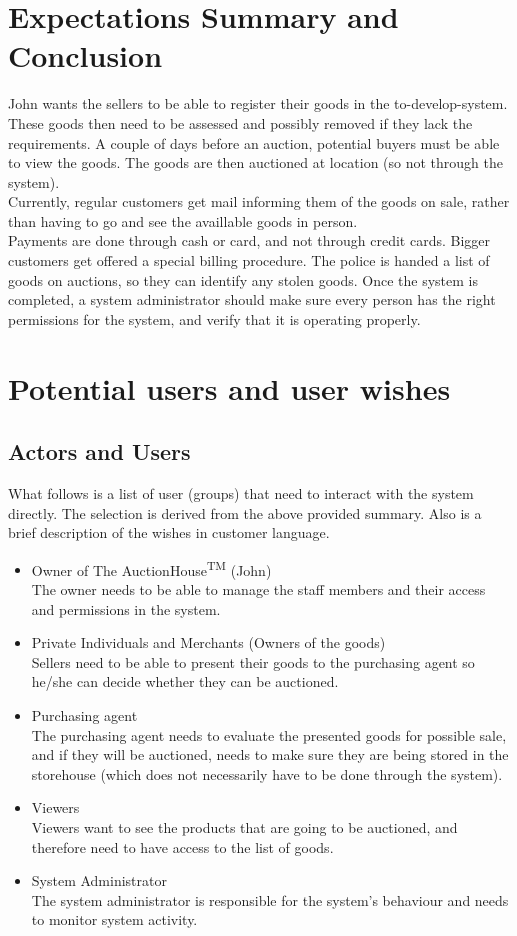 \documentclass{article}
\begin{document}
\section*{Expectations Summary and Conclusion}
John wants the sellers to be able to register their goods in the to-develop-system. These goods then need to be assessed and possibly removed if they lack the requirements. A couple of days before an auction, potential buyers must be able to view the goods. The goods are then auctioned at location (so not through the system).\\
Currently, regular customers get mail informing them of the goods on sale, rather than having to go and see the availlable goods in person.\\
Payments are done through cash or card, and not through credit cards. Bigger customers get offered a special billing procedure.
The police is handed a list of goods on auctions, so they can identify any stolen goods.
Once the system is completed, a system administrator should make sure every person has the right permissions for the system, and verify that it is operating properly.

\section*{Potential users and user wishes}
\subsection*{Actors and Users}
What follows is a list of user (groups) that need to interact with the system directly. The selection is derived from the above provided summary. Also is a brief description of the wishes in customer language.
\begin{itemize}
	\item Owner of The AuctionHouse\textsuperscript{TM} (John)\\
		The owner needs to be able to manage the staff members and their access and permissions in the system.
	\item Private Individuals and Merchants (Owners of the goods)\\
		Sellers need to be able to present their goods to the purchasing agent so he/she can decide whether they can be auctioned.
	\item Purchasing agent\\
		The purchasing agent needs to evaluate the presented goods for possible sale, and if they will be auctioned, needs to make sure they are being stored in the storehouse (which does not necessarily have to be done through the system).
	\item Viewers\\
		Viewers want to see the products that are going to be auctioned, and therefore need to have access to the list of goods.
	\item System Administrator\\
		The system administrator is responsible for the system's behaviour and needs to monitor system activity.
\end{itemize}
\end{document}
